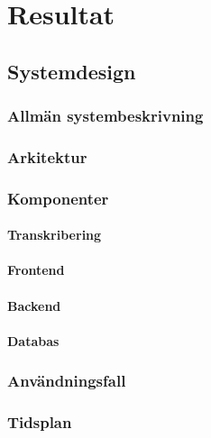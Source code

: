 \chapter{Resultat}

\section{Systemdesign}

\subsection{Allmän systembeskrivning}

\subsection{Arkitektur}

\subsection{Komponenter}

\subsubsection{Transkribering}

\subsubsection{Frontend}

\subsubsection{Backend}

\subsubsection{Databas}

\subsection{Användningsfall}

\subsection{Tidsplan}
